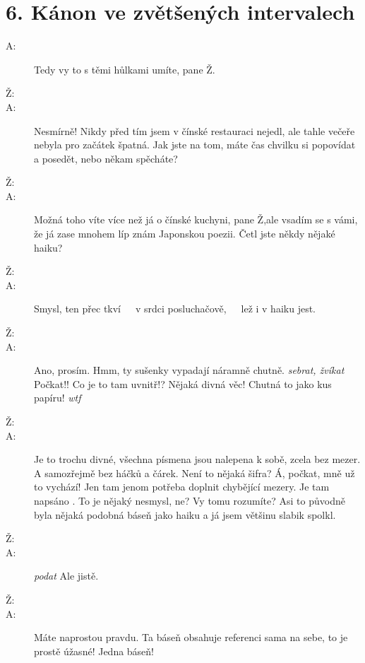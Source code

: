 \documentclass[12pt]{article}
\begin{document}
\section*{6. Kánon ve zvětšených intervalech}
\begin{description}
\item[A:] Tedy vy to s těmi hůlkami umíte, pane Ž.

\item[Ž:]

\item[A:] Nesmírně! Nikdy před tím jsem v čínské restauraci nejedl, ale
    tahle večeře nebyla pro začátek špatná. Jak jste na tom, máte čas chvilku
    si popovídat a posedět, nebo někam spěcháte?

\item[Ž:]

\item[A:] Možná toho víte více než já o čínské kuchyni, pane Ž,ale vsadím
    se s vámi, že já zase mnohem líp znám Japonskou poezii. Četl jste někdy
    nějaké haiku?

\item[Ž:]
    
\item[A:] Smysl, ten přec tkví\ \ \ v srdci posluchačově,\ \ \ lež i v haiku jest.

\item[Ž:]

\item[A:] Ano, prosím. Hmm, ty sušenky vypadají náramně chutně. \textit{sebrat, žvíkat}
    Počkat!! Co je to tam uvnitř!? Nějaká divná věc! Chutná to jako kus papíru! \textit{wtf}

\item[Ž:]

\item[A:] Je to trochu divné, všechna písmena jsou nalepena k sobě, zcela bez mezer.
    A samozřejmě bez háčků a čárek. Není to nějaká šifra? Á, počkat, mně už to vychází!
    Jen tam jenom potřeba doplnit chybějící mezery. Je tam napsáno .
    To je nějaký nesmysl, ne? Vy tomu rozumíte? Asi to původně byla nějaká podobná báseň
    jako haiku a já jsem většinu slabik spolkl.

\item[Ž:]

\item[A:] \textit{podat} Ale jistě.

\item[Ž:]

\item[A:] Máte naprostou pravdu. Ta báseň obsahuje referenci sama na sebe, to je prostě
    úžasné! Jedna báseň!


\end{description}
\end{document}
